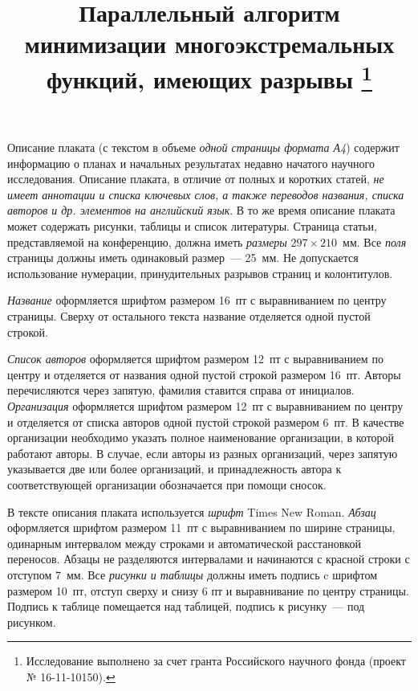 \documentclass[11pt, oneside, a4paper]{article}
\begin{document}

\title{Параллельный алгоритм минимизации многоэкстремальных функций, имеющих разрывы \footnote{Исследование выполнено за счет гранта Российского научного фонда (проект № 16-11-10150).}}


Описание плаката (с текстом в объеме \emph{одной страницы формата А4}) содержит информацию о планах и начальных результатах недавно начатого научного исследования. Описание плаката, в отличие от полных и коротких статей, \emph{не имеет аннотации и списка ключевых слов, а также переводов названия, списка авторов и др. элементов на английский язык}. В то же время описание плаката может содержать рисунки, таблицы и список литературы. Страница статьи, представляемой на конференцию, должна иметь \emph{размеры}
$297 \times 210$~мм. Все \emph{поля} страницы должны иметь одинаковый размер~--- 25~мм. Не допускается использование нумерации, принудительных разрывов страниц и колонтитулов.

\emph{Название} оформляется шрифтом размером 16~пт с выравниванием по центру страницы. Сверху от остального текста название отделяется одной пустой строкой. 

\emph{Список авторов} оформляется шрифтом размером 12~пт с выравниванием по центру и отделяется от названия одной пустой строкой размером 16~пт. Авторы перечисляются через запятую, фамилия ставится справа от инициалов. \emph{Организация} оформляется шрифтом размером 12~пт с выравниванием по центру и отделяется от списка авторов одной пустой строкой размером 6~пт. В качестве организации необходимо указать полное наименование организации, в которой работают авторы. В случае, если авторы из разных организаций, через запятую указывается две или более организаций, и принадлежность автора к соответствующей организации обозначается при помощи сносок.

В тексте описания плаката используется \emph{шрифт} Times New Roman. \emph{Абзац} оформляется шрифтом размером 11~пт с выравниванием по ширине страницы, одинарным интервалом между строками и автоматической расстановкой переносов. Абзацы не разделяются интервалами и начинаются с красной строки с отступом 7~мм. Все \emph{рисунки и таблицы} должны иметь подпись c шрифтом размером 10~пт, отступ сверху и снизу 6 пт и выравнивание по центру страницы. Подпись к таблице помещается над таблицей, подпись к рисунку~--- под рисунком. 
\end{document}
